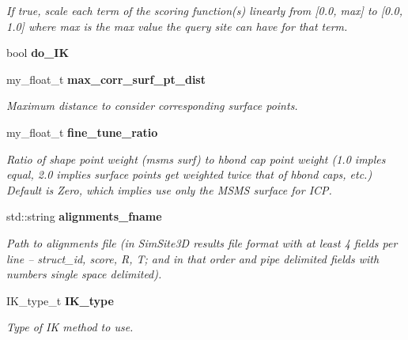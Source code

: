 \begin{CompactItemize}
\begin{CompactList}\small\item\em If true, scale each term of the scoring function(s) linearly from [0.0, max] to [0.0, 1.0] where max is the max value the query site can have for that term. \item\end{CompactList}\item 
bool \textbf{do\_\-IK}\label{classSimSite3D_1_1SearchParameters_ae98a5075be2f4c92734f47223076e6c}

\item 
my\_\-float\_\-t \bf{max\_\-corr\_\-surf\_\-pt\_\-dist}\label{classSimSite3D_1_1SearchParameters_ac2413e22df6100db6b73f5920cc9ddd}

\begin{CompactList}\small\item\em Maximum distance to consider corresponding surface points. \item\end{CompactList}\item 
my\_\-float\_\-t \bf{fine\_\-tune\_\-ratio}\label{classSimSite3D_1_1SearchParameters_62849cae5f51eb12263a341056af66c5}

\begin{CompactList}\small\item\em Ratio of shape point weight (msms surf) to hbond cap point weight (1.0 imples equal, 2.0 implies surface points get weighted twice that of hbond caps, etc.) Default is Zero, which implies use only the MSMS surface for ICP. \item\end{CompactList}\item 
std::string \bf{alignments\_\-fname}\label{classSimSite3D_1_1SearchParameters_5a36fe41006109a902194d9e2cf39e1a}

\begin{CompactList}\small\item\em Path to alignments file (in Sim\-Site3D results file format with at least 4 fields per line -- struct\_\-id, score, R, T; and in that order and pipe delimited fields with numbers single space delimited). \item\end{CompactList}\item 
IK\_\-type\_\-t \bf{IK\_\-type}\label{classSimSite3D_1_1SearchParameters_84a374fa89c1f6d5868a830091d2178c}

\begin{CompactList}\small\item\em Type of IK method to use. \item\end{CompactList}\end{CompactItemize}
